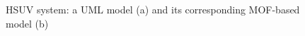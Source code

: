 \begin{figure}
  \centering
 \hspace{2mm}
  \caption{HSUV system: a UML model (a) and its corresponding MOF-based model (b)}
  \label{fig:hsuv}
\end{figure}
\vspace{-.7cm}

